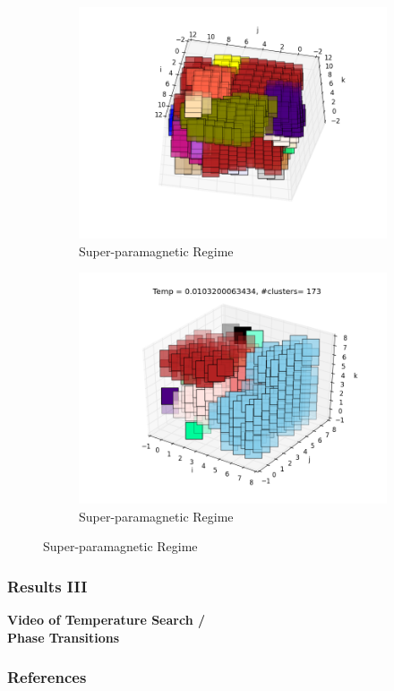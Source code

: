 \documentclass{beamer}
\begin{document}
\begin{frame}
\begin{figure}
\begin{subfigure}{0.45\textwidth}
  \centering
  \includegraphics[width=.9\linewidth]{fig/figure_1.png}
  \caption{Super-paramagnetic Regime}%
  \label{fig:fig_good_final_cluster_12}
\end{subfigure}
\hspace*{\fill}
\begin{subfigure}{0.45\textwidth}
  \centering

  \includegraphics[width=.9\linewidth]{fig/cluster-8x8x8-2.png}
  \caption{Super-paramagnetic Regime}%
  \label{fig:fig_good_final_cluster_7}
\end{subfigure}

\end{figure}
\end{frame}


\begin{frame}
\frametitle{Results III}
\begin{center}
	\textbf{\Large{Video of Temperature Search /\\ Phase Transitions}}
\end{center}
\end{frame}

\begin{frame}
    \frametitle{References}
    \printbibliography
\end{frame}
\end{document}
